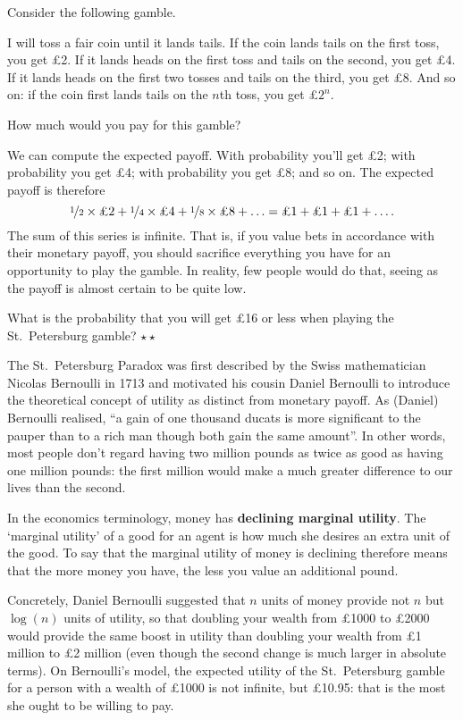 Consider the following gamble.
\begin{example}
  I will toss a fair coin until it lands tails. If the coin lands tails on
  the first toss, you get £2. If it lands heads on the first
  toss and tails on the second, you get £4. If it lands heads on the
  first two tosses and tails on the third, you get £8. And so on: if
  the coin first lands tails on the $n$th toss, you get £$2^n$.
\end{example}
How much would you pay for this gamble? 

We can compute the expected payoff. With probability 
you'll get £2; with probability  you get £4; with
probability  you get £8; and so on. The expected payoff
is therefore
\[
  \nicefrac{1}{2} \times \text{£2} + 
  \nicefrac{1}{4} \times \text{£4} + 
  \nicefrac{1}{8} \times \text{£8} + 
  \ldots = \text{£1} +  \text{£1} +  \text{£1} + \ldots. 
\]
The sum of this series is infinite. That is, if you value bets in
accordance with their monetary payoff, you should sacrifice everything
you have for an opportunity to play the gamble. In reality, few
people would do that, seeing as the payoff is almost certain to be
quite low.

\begin{exercise}
  What is the probability that you will get £16 or less when playing
  the St.\ Petersburg gamble? $\star\star$
\end{exercise}

The St.\ Petersburg Paradox was first described by the Swiss
mathematician Nicolas Bernoulli in 1713 and motivated his cousin
Daniel Bernoulli to introduce the theoretical concept of utility as
distinct from monetary payoff. As (Daniel) Bernoulli realised, ``a
gain of one thousand ducats is more significant to the pauper than to
a rich man though both gain the same amount''. In other words, most
people don't regard having two million pounds as twice as good as
having one million pounds: the first million would make a much greater
difference to our lives than the second.

In the economics terminology, money has \textbf{declining marginal
  utility}. The `marginal utility' of a good for an agent is how much
she desires an extra unit of the good. To say that the marginal
utility of money is declining therefore means that the more money you
have, the less you value an additional pound.

Concretely, Daniel Bernoulli suggested that $n$ units of money provide
not $n$ but $\log(n)$ units of utility, so that doubling your wealth
from £1000 to £2000 would provide the same boost in utility than
doubling your wealth from £1 million to £2 million (even though the
second change is much larger in absolute terms). On Bernoulli's model,
the expected utility of the St.\ Petersburg gamble for a person with a
wealth of £1000 is not infinite, but £10.95: that is the most she
ought to be willing to pay.

